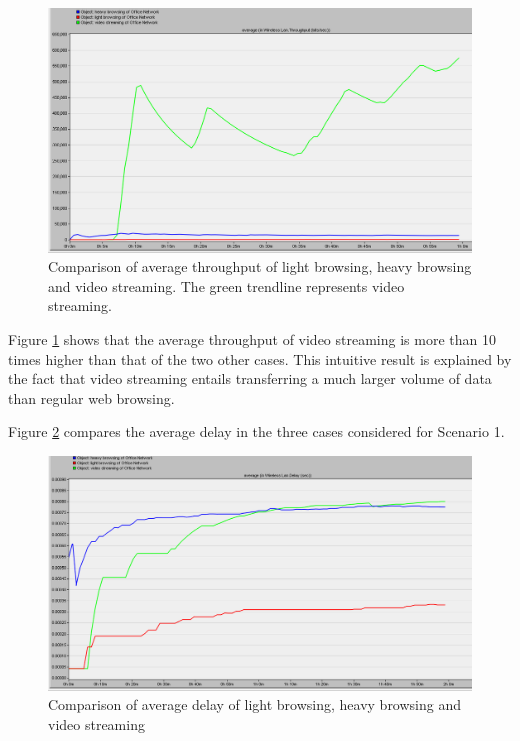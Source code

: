 \begin{figure}[H]
	\centering
	\includegraphics[scale=0.35]{Figures/amantianrenamed/ScenariooneAverageoverlaidthroughputbetweenvideostreaminglightbrowsingandheavybrowsing.png}
	\caption[Scenario 1: comparison of average throughput]{Comparison of average throughput of light browsing, heavy browsing and video streaming. The green trendline represents video streaming.}
	\label{subsubsec:1:summary:throughput}
\end{figure}

Figure \ref{subsubsec:1:summary:throughput} shows that the average throughput of video streaming is more than 10 times higher than that of the two other cases. This intuitive result is explained by the fact that video streaming entails transferring a much larger volume of data than regular web browsing.

Figure \ref{subsubsec:1:summary:delay1} compares the average delay in the three cases considered for Scenario 1.

\begin{figure}[H]
	\centering
	\includegraphics[scale=0.35]{Figures/amantianrenamed/Scenario1ver.png}
	\caption[Scenario 1: comparison of average delay]{Comparison of average delay of light browsing, heavy browsing and video streaming}
	\label{subsubsec:1:summary:delay1}
\end{figure}

